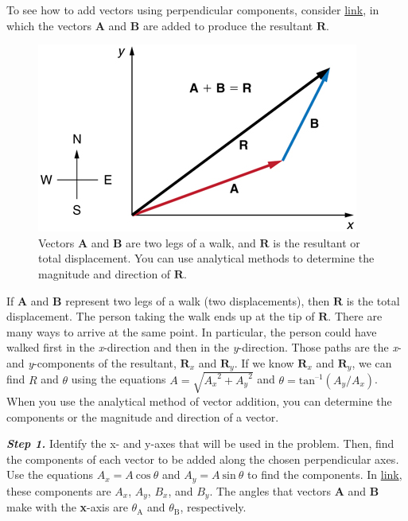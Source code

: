 \documentclass[
]{book}
\begin{document}
To see how to add vectors using perpendicular components, consider
\protect\hyperlink{import-auto-id1165298839640}{link}, in which
the vectors \(\mathbf{A}{}\) and \(\mathbf{B}{}\) are added to produce the
resultant \(\mathbf{R}{}\).

\begin{figure}
\hypertarget{import-auto-id1165298839640}{%
\centering
\includegraphics{images/Figure_03_03_05a.jpg}
\caption{Vectors \(\mathbf{A}{}\) and \(\mathbf{B}{}\) are two legs of a walk, and
\(\mathbf{R}{}\) is the resultant or total displacement. You can use
analytical methods to determine the magnitude and direction of
\(\mathbf{R}{}\).}\label{import-auto-id1165298839640}
}
\end{figure}

If \(\mathbf{A}\) and \(\mathbf{B}\) represent two legs of a walk (two
displacements), then \(\mathbf{R}\) is the total displacement. The person
taking the walk ends up at the tip of \(\mathbf{R}.\) There are many ways
to arrive at the same point. In particular, the person could have walked
first in the \emph{x}-direction and then in the \emph{y}-direction. Those paths
are the \emph{x}- and \emph{y}-components of the resultant, \(\mathbf{R}_{x}\) and
\(\mathbf{R}_{y}{}\). If we know \(\textbf{R}_{x}{}\) and
\(\mathbf{R}_{y}{}\), we can find \(R\) and \(\theta\) using the equations
\(A = \sqrt{{A_{x}}^{2} + {A_{y}}^{2}}\) and
\(\theta = \text{tan}^{–1}(A_{y}/A_{x})\). When you use the analytical
method of vector addition, you can determine the components or the
magnitude and direction of a vector.

\emph{\textbf{Step 1.} }Identify the x- and y-axes that will be used in the
problem. Then, find the components of each vector to be added along the
chosen perpendicular axes\emph{.} Use the equations
\({{A_{x} = A}\ \text{cos}\ \theta}{}\) and
\({{A_{y} = A}\ \text{sin}\ \theta}{}\) to find the components. In
\protect\hyperlink{import-auto-id1165296674934}{link}, these
components are \(A_{x}{}\), \(A_{y}{}\), \(B_{x}{}\), and \(B_{y}{}\). The
angles that vectors \(\mathbf{A}{}\) and \(\mathbf{B}{}\) make with the
\textbf{x}-axis are \(\theta_{\text{A}}{}\) and \(\theta_{\text{B}}{}\),
respectively.
\end{document}

